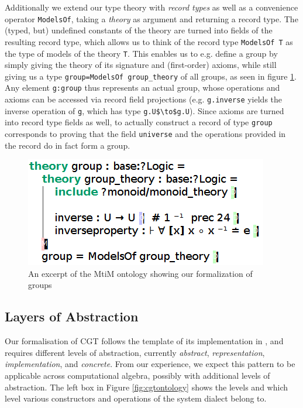Additionally we extend our type theory with \emph{record types} as well as a convenience operator \lstinline|ModelsOf|, taking a \emph{theory} as argument and returning a record type. The (typed, but) undefined constants of the theory are turned into fields of the resulting record type, which allows us to think of the record type \lstinline|ModelsOf T| as the type of models of the theory \lstinline|T|. This enables us to e.g. define a group by simply giving the theory of its signature and (first-order) axioms, while still giving us a type \lstinline|group=ModelsOf group_theory| of all groups, as seen in figure \ref{fig:mitm1}. Any element \lstinline|g:group| thus represents an actual group, whose operations and axioms can be accessed via record field projections (e.g. \lstinline|g.inverse| yields the inverse operation of \lstinline|g|, which has type \lstinline[mathescape]|g.U$\to$g.U|). Since axioms are turned into record type fields as well, to actually construct a record of type \lstinline|group| corresponds to proving that the field \lstinline|universe| and the operations provided in the record do in fact form a group.

\begin{figure}[ht]\centering
  \includegraphics[width=.5\textwidth]{mitm1}
  \caption{An excerpt of the MtiM ontology showing our formalization of groups}\label{fig:mitm1}
\end{figure}

\subsection{Layers of Abstraction}

Our formalisation of CGT follows the template of its implementation in \GAP, and requires
different levels of abstraction, currently \emph{abstract}, \emph{representation},
\emph{implementation}, and \emph{concrete}.  From our experience, we expect this pattern
to be applicable across computational algebra, possibly with additional levels of
abstraction. The left box in Figure \ref{fig:cgtontology} shows the levels and which level
various constructors and operations of the \GAP system dialect belong to.

